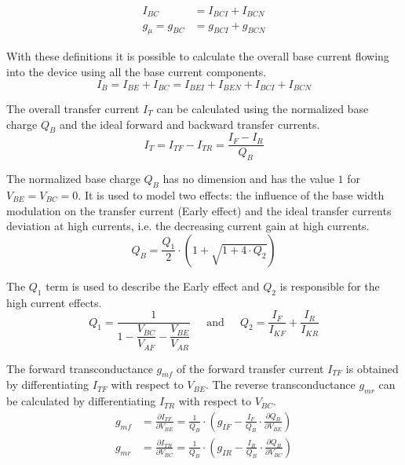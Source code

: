 \documentclass[10pt]{report}
\begin{document}
\begin{align}
I_{BC} &= I_{BCI} + I_{BCN}\\
g_{\mu} = g_{BC} &= g_{BCI} + g_{BCN}
\end{align}

With these definitions it is possible to calculate the overall base
current flowing into the device using all the base current components.
\begin{equation}
I_B = I_{BE} + I_{BC} = I_{BEI} + I_{BEN} + I_{BCI} + I_{BCN}
\end{equation}

The overall transfer current $I_T$ can be calculated using the
normalized base charge $Q_B$ and the ideal forward and backward
transfer currents.
\begin{equation}
I_T = I_{TF} - I_{TR} = \dfrac{I_F - I_R}{Q_B}
\end{equation}

The normalized base charge $Q_B$ has no dimension and has the value
$1$ for $V_{BE} = V_{BC} = 0$.  It is used to model two effects: the
influence of the base width modulation on the transfer current (Early
effect) and the ideal transfer currents deviation at high currents,
i.e. the decreasing current gain at high currents.
\begin{equation}
Q_B = \frac{Q_1}{2} \cdot \left(1 + \sqrt{1 + 4\cdot Q_2}\right)
\end{equation}

The $Q_1$ term is used to describe the Early effect and $Q_2$ is
responsible for the high current effects.
\begin{equation}
Q_1 = \frac{1}{1 - \dfrac{V_{BC}}{V_{AF}} - \dfrac{V_{BE}}{V_{AR}}}
\;\;\;\; \text{ and } \;\;\;\;
Q_2 = \frac{I_F}{I_{KF}} + \frac{I_R}{I_{KR}}
\end{equation}

The forward transconductance $g_{mf}$ of the forward transfer current
$I_{TF}$ is obtained by differentiating $I_{TF}$ with respect to
$V_{BE}$.  The reverse transconductance $g_{mr}$ can be calculated by
differentiating $I_{TR}$ with respect to $V_{BC}$.
\begin{align}
\label{eq:SGPgmf}
g_{mf} &= \frac{\partial I_{TF}}{\partial V_{BE}} = \frac{1}{Q_B}\cdot\left(g_{IF} - \frac{I_F}{Q_B}\cdot \frac{\partial Q_B}{\partial V_{BE}}\right)\\
\label{eq:SGPgmr}
g_{mr} &= \frac{\partial I_{TR}}{\partial V_{BC}} = \frac{1}{Q_B}\cdot\left(g_{IR} - \frac{I_R}{Q_B}\cdot \frac{\partial Q_B}{\partial V_{BC}}\right)
\end{align}
\end{document}
